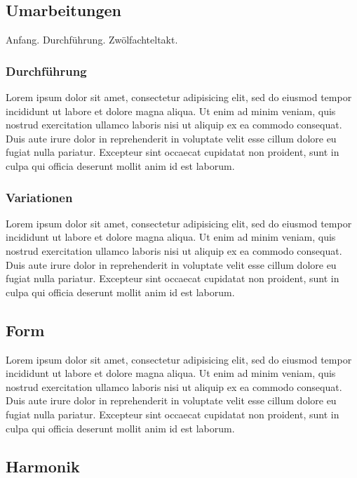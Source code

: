 \subsection{Umarbeitungen}

Anfang.
Durchführung.
Zwölfachteltakt.

\subsubsection{Durchführung}

Lorem ipsum dolor sit amet, consectetur adipisicing elit, sed do eiusmod tempor incididunt ut labore et dolore magna aliqua. Ut enim ad minim veniam, quis nostrud exercitation ullamco laboris nisi ut aliquip ex ea commodo consequat. Duis aute irure dolor in reprehenderit in voluptate velit esse cillum dolore eu fugiat nulla pariatur. Excepteur sint occaecat cupidatat non proident, sunt in culpa qui officia deserunt mollit anim id est laborum.

\subsubsection{Variationen}

Lorem ipsum dolor sit amet, consectetur adipisicing elit, sed do eiusmod tempor incididunt ut labore et dolore magna aliqua. Ut enim ad minim veniam, quis nostrud exercitation ullamco laboris nisi ut aliquip ex ea commodo consequat. Duis aute irure dolor in reprehenderit in voluptate velit esse cillum dolore eu fugiat nulla pariatur. Excepteur sint occaecat cupidatat non proident, sunt in culpa qui officia deserunt mollit anim id est laborum.


\subsection{Form}

Lorem ipsum dolor sit amet, consectetur adipisicing elit, sed do eiusmod tempor incididunt ut labore et dolore magna aliqua. Ut enim ad minim veniam, quis nostrud exercitation ullamco laboris nisi ut aliquip ex ea commodo consequat. Duis aute irure dolor in reprehenderit in voluptate velit esse cillum dolore eu fugiat nulla pariatur. Excepteur sint occaecat cupidatat non proident, sunt in culpa qui officia deserunt mollit anim id est laborum.


\subsection{Harmonik}

